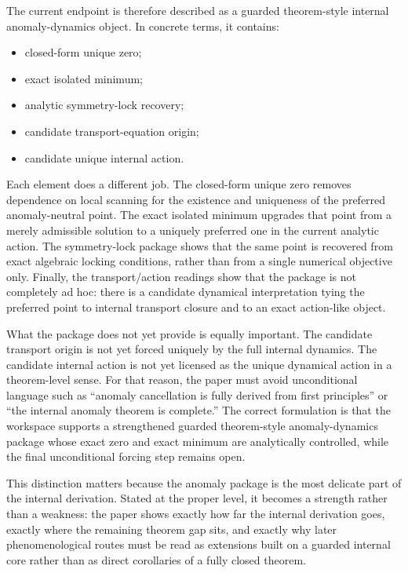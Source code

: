 \documentclass[11pt]{article}
\begin{document}
The current endpoint is therefore described as a guarded theorem-style internal anomaly-dynamics object. In concrete terms, it contains:
\begin{itemize}
    \item closed-form unique zero;
    \item exact isolated minimum;
    \item analytic symmetry-lock recovery;
    \item candidate transport-equation origin;
    \item candidate unique internal action.
\end{itemize}
Each element does a different job. The closed-form unique zero removes dependence on local scanning for the existence and uniqueness of the preferred anomaly-neutral point. The exact isolated minimum upgrades that point from a merely admissible solution to a uniquely preferred one in the current analytic action. The symmetry-lock package shows that the same point is recovered from exact algebraic locking conditions, rather than from a single numerical objective only. Finally, the transport/action readings show that the package is not completely ad hoc: there is a candidate dynamical interpretation tying the preferred point to internal transport closure and to an exact action-like object.

What the package does not yet provide is equally important. The candidate transport origin is not yet forced uniquely by the full internal dynamics. The candidate internal action is not yet licensed as the unique dynamical action in a theorem-level sense. For that reason, the paper must avoid unconditional language such as ``anomaly cancellation is fully derived from first principles'' or ``the internal anomaly theorem is complete.'' The correct formulation is that the workspace supports a strengthened guarded theorem-style anomaly-dynamics package whose exact zero and exact minimum are analytically controlled, while the final unconditional forcing step remains open.

This distinction matters because the anomaly package is the most delicate part of the internal derivation. Stated at the proper level, it becomes a strength rather than a weakness: the paper shows exactly how far the internal derivation goes, exactly where the remaining theorem gap sits, and exactly why later phenomenological routes must be read as extensions built on a guarded internal core rather than as direct corollaries of a fully closed theorem.
\end{document}
